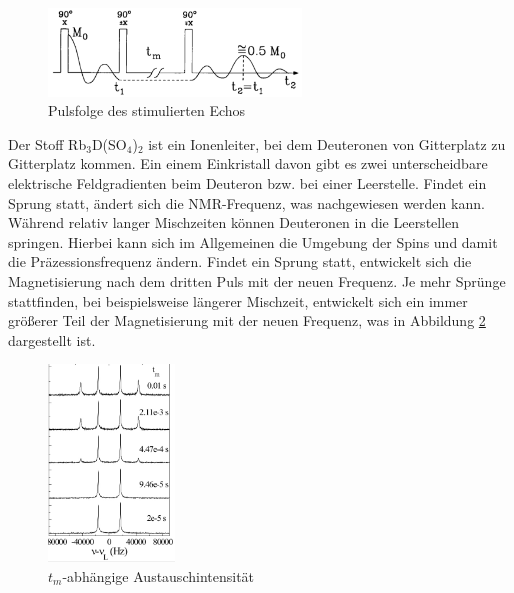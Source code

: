 \begin{figure}[H]
 \includegraphics[width=0.6\textwidth]{../pics/stimEchoFolge.jpg}
 \caption{Pulsfolge des stimulierten Echos}
 \label{pic_stimEchoFolge}
\end{figure}
\noindent
Der Stoff Rb$_3$D(SO$_4$)$_2$ ist ein Ionenleiter, bei dem Deuteronen von Gitterplatz zu Gitterplatz kommen. Ein einem Einkristall davon gibt es zwei
unterscheidbare elektrische Feldgradienten beim Deuteron bzw. bei einer Leerstelle. Findet ein Sprung statt, ändert sich die NMR-Frequenz, was nachgewiesen
werden kann. Während relativ langer Mischzeiten können Deuteronen in die Leerstellen springen. Hierbei kann sich im Allgemeinen 
die Umgebung der Spins und damit die Präzessionsfrequenz ändern. Findet ein Sprung statt, entwickelt sich die Magnetisierung nach dem dritten Puls mit der
neuen Frequenz. Je mehr Sprünge stattfinden, bei beispielsweise längerer Mischzeit, entwickelt sich ein immer größerer Teil der Magnetisierung mit der 
neuen Frequenz, was in Abbildung \ref{pic_neueFrequenz} dargestellt ist.
\begin{figure}[H]
 \includegraphics[width=0.3\textwidth]{../pics/neueFrequenz.jpg}
 \caption{$t_m$-abhängige Austauschintensität}
 \label{pic_neueFrequenz}
\end{figure}
